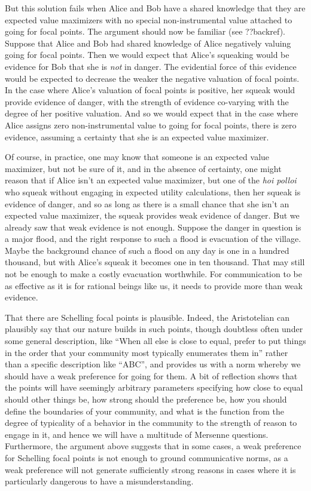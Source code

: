 But this solution fails when Alice and Bob have a shared knowledge that they are expected value maximizers
with no special non-instrumental value attached to going for focal points. The argument should now be familiar
(see ??backref).
Suppose that Alice and Bob had shared knowledge of Alice negatively valuing going for focal points. Then we
would expect that Alice's squeaking would be evidence for Bob that she is \textit{not} in danger. The evidential
force of this evidence would be expected to decrease the weaker the negative valuation of focal points.
In the case where Alice's valuation of focal points is positive, her squeak would provide evidence of danger,
with the strength of evidence co-varying with the degree of her positive valuation. And so we would expect
that in the case where Alice assigns zero non-instrumental value to going for focal points, there is zero evidence,
assuming a certainty that she is an expected value maximizer.

Of course, in practice, one may know that someone is an expected value maximizer, but not be sure of it, and in
the absence of certainty, one might reason that if Alice isn't an expected value maximizer, but one of the
\textit{hoi polloi} who squeak without engaging in expected utility calculations, then her squeak is 
evidence of danger, and so as long as there is a small chance that she isn't an expected value maximizer,
the squeak provides weak evidence of danger. But we already saw that weak evidence is not enough. 
Suppose the danger in question is a major 
flood, and the right response to such a flood is evacuation of the village. Maybe the background chance of such a
flood on any day is one in a hundred thousand, but with Alice's squeak it becomes one in ten thousand. That may
still not be enough to make a costly evacuation worthwhile. For communication to be as effective as it is for rational
beings like us, it needs to provide more than weak evidence.

That there are Schelling focal points is plausible. Indeed, the Aristotelian can plausibly say that our
nature builds in such points, though doubtless often under some general description, like ``When all else is close to
equal, prefer to put
things in the order that your community most typically enumerates them in'' rather than a specific
description like ``ABC'', and provides us with a norm whereby we should have a weak preference for going
for them. A bit of reflection shows that the points will have seemingly arbitrary parameters specifying how close to
equal should other things be, how strong should the preference be, how you should define the boundaries of your
community, and what is the function from the degree of typicality of a behavior in the community to the strength of
reason to engage in it, and hence we will have a multitude of Mersenne questions. Furthermore, the argument above
suggests that in some cases, a weak preference for Schelling focal points is not enough to ground communicative
norms, as a weak preference will not generate sufficiently strong reasons in cases where it is particularly
dangerous to have a misunderstanding.

